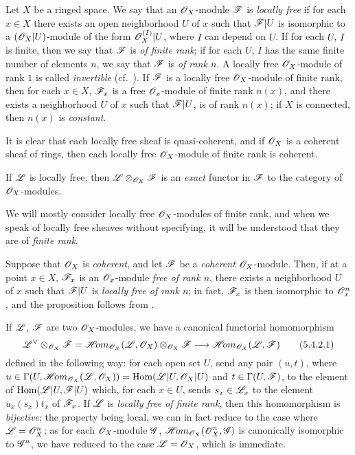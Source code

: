 \begin{env}[5.4.1]
\label{0.5.4.1}
Let $X$ be a ringed space.
We say that an $\mathscr{O}_X$-module $\mathscr{F}$ is \emph{locally free} if for each $x\in X$ there exists an open neighborhood $U$ of $x$ such that $\mathscr{F}|U$ is isomorphic to a $(\mathscr{O}_X|U)$-module of the form $\mathscr{O}_X^{(I)}|U$, where $I$ can depend on $U$.
If for each $U$, $I$ is finite, then we say that $\mathscr{F}$ is \emph{of finite rank};
if for each $U$, $I$ has the same finite number of elements $n$, we say that $\mathscr{F}$ is \emph{of rank $n$}.
A locally free $\mathscr{O}_X$-module of rank $1$ is called \emph{invertible} (cf.~).
If $\mathscr{F}$ is a locally free $\mathscr{O}_X$-module of finite rank, then for each $x\in X$, $\mathscr{F}_x$ is a free $\mathscr{O}_x$-module of finite rank $n(x)$, and there exists a neighborhood $U$ of $x$ such that $\mathscr{F}|U$, is of rank $n(x)$;
if $X$ is connected, then $n(x)$ is \emph{constant}.

It is clear that each locally free sheaf is quasi-coherent, and if $\mathscr{O}_X$ is a coherent sheaf of rings, then each locally free $\mathscr{O}_X$-module of finite rank is coherent.

If $\mathscr{L}$ is locally free, then $\mathscr{L}\otimes_{\mathscr{O}_X}\mathscr{F}$ is an \emph{exact} functor in $\mathscr{F}$ to the category of $\mathscr{O}_X$-modules.

We will mostly consider locally free $\mathscr{O}_X$-modules of finite rank,
and when we speak of locally free sheaves without specifying, it will be understood that they are of \emph{finite rank}.

Suppose that $\mathscr{O}_X$ is \emph{coherent}, and let $\mathscr{F}$ be a \emph{coherent} $\mathscr{O}_X$-module.
Then, if at a point $x\in X$, $\mathscr{F}_x$ is an $\mathscr{O}_x$-module \emph{free of rank $n$}, there exists a neighborhood $U$ of $x$ such that $\mathscr{F}|U$ is \emph{locally free of rank $n$};
in fact, $\mathscr{F}_x$ is then isomorphic to $\mathscr{O}_x^n$, and the proposition follows from .
\end{env}

\begin{env}[5.4.2]
\label{0.5.4.2}
If $\mathscr{L}$, $\mathscr{F}$ are two $\mathscr{O}_X$-modules, we have a canonical functorial homomorphism
\[
  \dual{\sh{L}}\otimes_{\sh{O}_X}\sh{F}=\shHom_{\sh{O}_X}(\sh{L},\sh{O}_X)\otimes_{\sh{O}_X}\sh{F}\to\shHom_{\sh{O}_X}(\sh{L},\sh{F})
  \tag{5.4.2.1}
\]
defined in the following way:
for each open set $U$, send any pair $(u,t)$, where $u\in\Gamma(U,\mathscr{H}\!{om}_{\mathscr{O}_X}(\mathscr{L},\mathscr{O}_X))={\mathop{\mathrm{Hom}}\nolimits}(\mathscr{L}|U,\mathscr{O}_X|U)$ and $t\in\Gamma(U,\mathscr{F})$, to the element of ${\mathop{\mathrm{Hom}}\nolimits}(\mathscr{L}|U,\mathscr{F}|U)$ which, for each $x\in U$, sends $s_x\in\mathscr{L}_x$ to the element $u_x(s_x)t_x$ of $\mathscr{F}_x$.
If $\mathscr{L}$ is \emph{locally free of finite rank}, then this homomorphism is \emph{bijective};
the property being local, we can in fact reduce to the case where $\mathscr{L}=\mathscr{O}_X^n$;
as for each $\mathscr{O}_X$-module $\mathscr{G}$, $\mathscr{H}\!{om}_{\mathscr{O}_X}(\mathscr{O}_X^n,\mathscr{G})$ is canonically isomorphic to $\mathscr{G}^n$, we have reduced to the case $\mathscr{L}=\mathscr{O}_X$, which is immediate.
\end{env}

